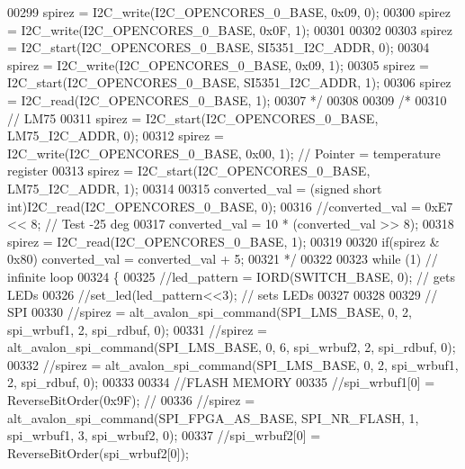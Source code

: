 \begin{DoxyCode}
00299 \textcolor{comment}{    spirez = I2C\_write(I2C\_OPENCORES\_0\_BASE, 0x09, 0);}
00300 \textcolor{comment}{    spirez = I2C\_write(I2C\_OPENCORES\_0\_BASE, 0x0F, 1);}
00301 \textcolor{comment}{}
00302 \textcolor{comment}{}
00303 \textcolor{comment}{    spirez = I2C\_start(I2C\_OPENCORES\_0\_BASE, SI5351\_I2C\_ADDR, 0);}
00304 \textcolor{comment}{    spirez = I2C\_write(I2C\_OPENCORES\_0\_BASE, 0x09, 1);}
00305 \textcolor{comment}{    spirez = I2C\_start(I2C\_OPENCORES\_0\_BASE, SI5351\_I2C\_ADDR, 1);}
00306 \textcolor{comment}{    spirez = I2C\_read(I2C\_OPENCORES\_0\_BASE, 1);}
00307 \textcolor{comment}{*/}
00308 
00309  \textcolor{comment}{/*}
00310 \textcolor{comment}{    // LM75}
00311 \textcolor{comment}{    spirez = I2C\_start(I2C\_OPENCORES\_0\_BASE, LM75\_I2C\_ADDR, 0);}
00312 \textcolor{comment}{    spirez = I2C\_write(I2C\_OPENCORES\_0\_BASE, 0x00, 1);              // Pointer = temperature register}
00313 \textcolor{comment}{    spirez = I2C\_start(I2C\_OPENCORES\_0\_BASE, LM75\_I2C\_ADDR, 1);}
00314 \textcolor{comment}{}
00315 \textcolor{comment}{    converted\_val = (signed short int)I2C\_read(I2C\_OPENCORES\_0\_BASE, 0);}
00316 \textcolor{comment}{    //converted\_val = 0xE7 << 8;    // Test -25 deg}
00317 \textcolor{comment}{    converted\_val = 10 * (converted\_val >> 8);}
00318 \textcolor{comment}{    spirez = I2C\_read(I2C\_OPENCORES\_0\_BASE, 1);}
00319 \textcolor{comment}{}
00320 \textcolor{comment}{    if(spirez & 0x80) converted\_val = converted\_val + 5;}
00321 \textcolor{comment}{*/}
00322 
00323     \textcolor{keywordflow}{while} (1)   \textcolor{comment}{// infinite loop}
00324     \{
00325         \textcolor{comment}{//led\_pattern = IORD(SWITCH\_BASE, 0);     // gets LEDs}
00326         \textcolor{comment}{//set\_led(led\_pattern<<3);                     // sets LEDs}
00327 
00328 
00329         \textcolor{comment}{// SPI}
00330         \textcolor{comment}{//spirez = alt\_avalon\_spi\_command(SPI\_LMS\_BASE, 0, 2, spi\_wrbuf1, 2, spi\_rdbuf, 0);}
00331         \textcolor{comment}{//spirez = alt\_avalon\_spi\_command(SPI\_LMS\_BASE, 0, 6, spi\_wrbuf2, 2, spi\_rdbuf, 0);}
00332         \textcolor{comment}{//spirez = alt\_avalon\_spi\_command(SPI\_LMS\_BASE, 0, 2, spi\_wrbuf1, 2, spi\_rdbuf, 0);}
00333 
00334         \textcolor{comment}{//FLASH MEMORY}
00335         \textcolor{comment}{//spi\_wrbuf1[0] = ReverseBitOrder(0x9F);    //}
00336         \textcolor{comment}{//spirez = alt\_avalon\_spi\_command(SPI\_FPGA\_AS\_BASE, SPI\_NR\_FLASH, 1, spi\_wrbuf1, 3, spi\_wrbuf2, 0);}
00337         \textcolor{comment}{//spi\_wrbuf2[0] = ReverseBitOrder(spi\_wrbuf2[0]);}

\end{DoxyCode}
